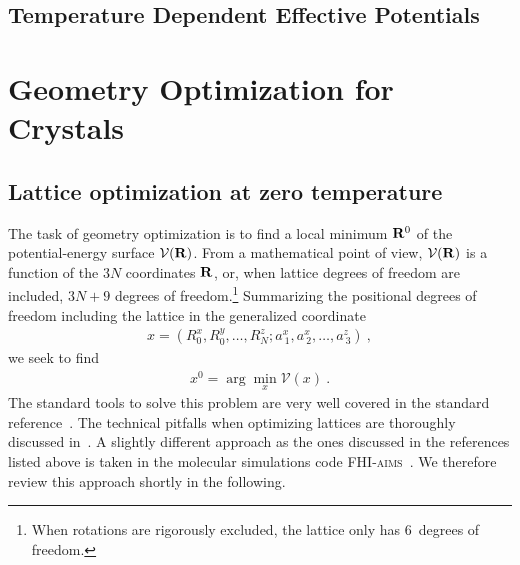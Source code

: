 
\section{Temperature Dependent Effective Potentials}

\chapter{Geometry Optimization for Crystals}
\section{Lattice optimization at zero temperature}
\label{sec:ltrm}
The task of geometry optimization is to find a local minimum ${\bf R}^0$ of the potential-energy surface $\mathcal{V} ({\bf R})$. From a mathematical point of view, $\mathcal V ({\bf R})$ is a function of the $3N$ coordinates ${\bf R}$, or, when lattice degrees of freedom are included, $3N + 9$ degrees of freedom.\footnote{When rotations are rigorously excluded, the lattice only has 6~degrees of freedom.} Summarizing the positional degrees of freedom including the lattice in the generalized coordinate
\begin{align}
x 
= \left( R_{0}^x, R_{0}^y, \ldots, R_{N}^z; a^x_{~1}, a^x_{~2}, \ldots, a^z_{~3} \right) ~,
\label{eq:opt.x}
\end{align}
we seek to find
\begin{align}
x^0 = \arg \min_x \mathcal V (x)~.
\end{align}
The standard tools to solve this problem are very well covered in the standard reference~\cite{nocedal2006}. The technical pitfalls when optimizing lattices are thoroughly discussed in~\cite{Pfrommer.1997,Tadmor.1999}.
A slightly different approach as the ones discussed in the references listed above is taken in the molecular simulations code \textsc{FHI-aims}~\cite{FHI-aims}. We therefore review this approach shortly in the following.

